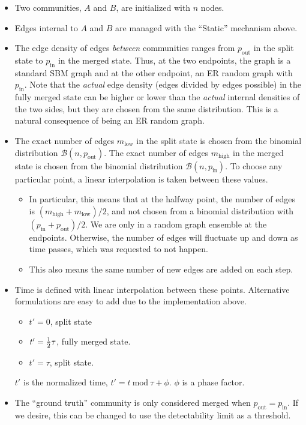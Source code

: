 \documentclass{article}
\def\pin{p_\mathrm{in}}
\def\pout{p_\mathrm{out}}
\def\low{\mathrm{low}}
\def\high{\mathrm{high}}
\begin{document}
\begin{itemize}
\item Two communities, $A$ and $B$, are initialized with $n$ nodes.
\item Edges internal to $A$ and $B$ are managed with the ``Static''
  mechanism above.
\item The edge density of edges \textsl{between} communities ranges
  from $\pout$ in the split state to $\pin$ in the merged state.
  Thus, at the two endpoints, the graph is a standard SBM graph and at
  the other endpoint, an ER random graph with $\pin$.  Note that the
  \textsl{actual} edge density (edges divided by edges possible) in
  the fully merged state can be higher or lower than the
  \textsl{actual} internal densities of
  the two sides, but they are chosen from the same distribution.  This
  is a natural consequence of being an ER random graph.
\item The exact number of edges $m_\low$ in the split state is chosen
  from the binomial distribution $\mathcal{B}(n, \pout)$.  The exact
  number of edges $m_\high$ in the merged state is chosen from the
  binomial distribution $\mathcal{B}(n, \pin)$.  To choose any
  particular point, a linear interpolation is taken between these
  values.
  \begin{itemize}
  \item In particular, this means that at the halfway point, the
    number of edges is $(m_\high+m_\low)/2$, and not chosen from a
    binomial distribution with $(\pin+\pout)/2$.  We are only in a
    random graph ensemble at the endpoints.  Otherwise, the number of
    edges will fluctuate up and down as time passes, which was
    requested to not happen.
  \item This also means the same number of new edges are added on each
    step.
  \end{itemize}
\item Time is defined with linear interpolation between these
  points.  Alternative formulations are easy to add due to the
  implementation above.
  \begin{itemize}
  \item $t'=0$, split state
  \item $t'={1 \over 2} \tau$, fully merged state.
  \item $t'=\tau$, split state.
  \end{itemize}
  $t'$ is the normalized time, $t' = t ~ \mathrm{mod} ~ \tau + \phi$.  $\phi$ is a
  phase factor.
\item The ``ground truth'' community is only considered merged when
  $\pout=\pin$.  If we desire, this can be changed to use the
  detectability limit as a threshold.
\end{itemize}
\end{document}
